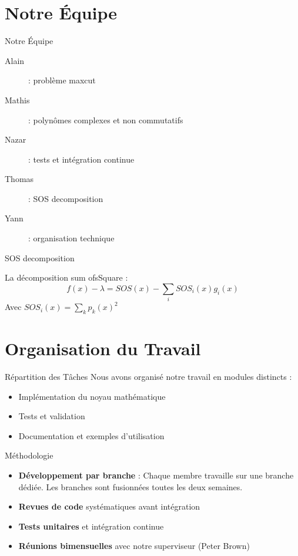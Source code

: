 \documentclass{beamer}
\begin{document}
\section{Notre Équipe}

\begin{frame}{Notre Équipe}
\begin{description}
    \item[Alain]: problème maxcut
    \item[Mathis]: polynômes complexes et non commutatifs
    \item[Nazar]: tests et intégration continue
    \item[Thomas]: SOS decomposition
    \item[Yann]: organisation technique
\end{description}
\end{frame}

\begin{frame}{SOS decomposition}

    La décomposition sum ofsSquare : 
$$f(x) - \lambda = SOS(x) - \sum_i SOS_i(x) g_i(x)$$
Avec $SOS_i(x) = \sum_k p_k(x)^2$  
\end{frame}

\section{Organisation du Travail}




\begin{frame}{Répartition des Tâches}
Nous avons organisé notre travail en modules distincts :
\begin{itemize}
    \item Implémentation du noyau mathématique
    \item Tests et validation
    \item Documentation et exemples d'utilisation
\end{itemize}
\end{frame}

\begin{frame}{Méthodologie}
\begin{itemize}
    \item \textbf{Développement par branche} : Chaque membre travaille sur une branche dédiée. Les branches sont fusionnées toutes les deux semaines.
    \item \textbf{Revues de code} systématiques avant intégration
    \item \textbf{Tests unitaires} et intégration continue
    \item \textbf{Réunions bimensuelles} avec notre superviseur (Peter Brown)
\end{itemize}
\end{frame}
\end{document}
